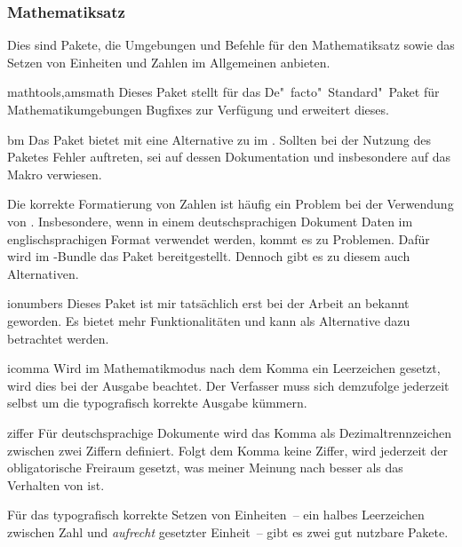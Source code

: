\subsubsection{Mathematiksatz}
Dies sind Pakete, die Umgebungen und Befehle für den Mathematiksatz sowie das 
Setzen von Einheiten und Zahlen im Allgemeinen anbieten.

\begin{packages}
  \item[mathtools,amsmath]
    Dieses Paket stellt für das De"~facto"~Standard"~Paket  
    für Mathematikumgebungen Bugfixes zur Verfügung und erweitert dieses.
  \item[bm]
    Das Paket bietet mit  eine Alternative zu  im 
    . Sollten 
    bei der Nutzung des Paketes Fehler auftreten, sei auf dessen Dokumentation 
    und insbesondere auf das Makro  verwiesen.
\end{packages}
%
Die korrekte Formatierung von Zahlen ist häufig ein Problem bei der Verwendung 
von . Insbesondere, wenn in einem deutschsprachigen Dokument 
Daten im englischsprachigen Format verwendet werden, kommt es zu Problemen. 
Dafür wird im \TUDScript-Bundle das Paket  bereitgestellt. 
Dennoch gibt es zu diesem auch Alternativen.
%
\begin{packages}
%
  \item[ionumbers]
    Dieses Paket ist mir tatsächlich erst bei der Arbeit an  
    bekannt geworden. Es bietet mehr Funktionalitäten und kann als Alternative 
    dazu betrachtet werden.
  \item[icomma]
    Wird im Mathematikmodus nach dem Komma ein Leerzeichen gesetzt, wird dies 
    bei der Ausgabe beachtet. Der Verfasser muss sich demzufolge jederzeit 
    selbst um die typografisch korrekte Ausgabe kümmern.
  \item[ziffer]
    Für deutschsprachige Dokumente wird das Komma als Dezimaltrennzeichen 
    zwischen zwei Ziffern definiert. Folgt dem Komma keine Ziffer, wird 
    jederzeit der obligatorische Freiraum gesetzt, was meiner Meinung nach 
    besser als das Verhalten von  ist.
%
\end{packages}
%
Für das typografisch korrekte Setzen von Einheiten~-- ein halbes Leerzeichen 
zwischen Zahl und \emph{aufrecht} gesetzter Einheit~-- gibt es zwei gut 
nutzbare Pakete.
